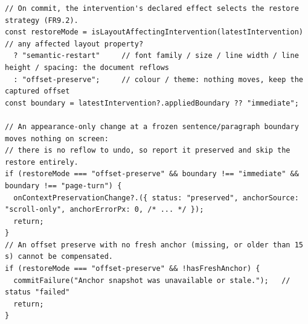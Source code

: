 \begin{listing}[htbp]
\begin{verbatim}
// On commit, the intervention's declared effect selects the restore strategy (FR9.2).
const restoreMode = isLayoutAffectingIntervention(latestIntervention)  // any affected layout property?
  ? "semantic-restart"     // font family / size / line width / line height / spacing: the document reflows
  : "offset-preserve";     // colour / theme: nothing moves, keep the captured offset
const boundary = latestIntervention?.appliedBoundary ?? "immediate";

// An appearance-only change at a frozen sentence/paragraph boundary moves nothing on screen:
// there is no reflow to undo, so report it preserved and skip the restore entirely.
if (restoreMode === "offset-preserve" && boundary !== "immediate" && boundary !== "page-turn") {
  onContextPreservationChange?.({ status: "preserved", anchorSource: "scroll-only", anchorErrorPx: 0, /* ... */ });
  return;
}
// An offset preserve with no fresh anchor (missing, or older than 15 s) cannot be compensated.
if (restoreMode === "offset-preserve" && !hasFreshAnchor) {
  commitFailure("Anchor snapshot was unavailable or stale.");   // status "failed"
  return;
}
\end{verbatim}
\caption{Selecting a restore mode (abbreviated from \texttt{usePreserveReadingContext.ts}): layout-affecting change → semantic restart; appearance-only → offset preserve; short-circuit exits for frozen boundaries and missing anchors.}
\label{lst:impl-restore-mode}
\end{listing}

